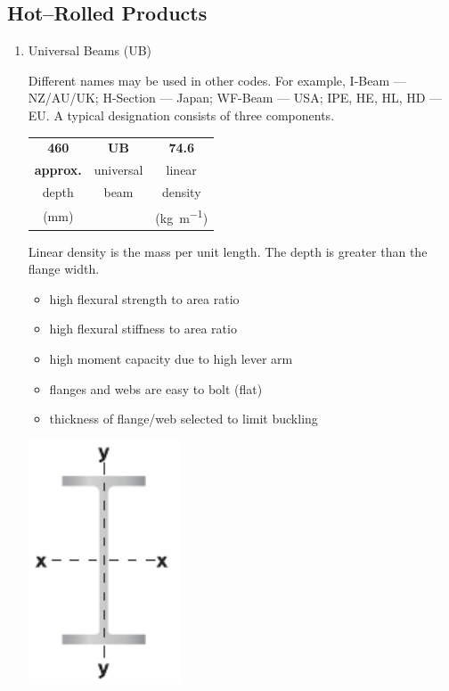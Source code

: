 \subsection{Hot--Rolled Products}
\begin{enumerate}[itemsep=1em]
\item Universal Beams (UB)\qquad\ASNZSSTEEL{~}\\[1em]
\begin{minipage}[t]{9cm}
Different names may be used in other codes. For example, I-Beam --- NZ/AU/UK; H-Section --- Japan; WF-Beam --- USA; IPE, HE, HL, HD --- EU. A typical designation consists of three components.
\begin{table}[H]\centering
\begin{tabular}{ccc}
	  \textbf{460}   & \textbf{UB} &       \textbf{74.6}        \\
	\textbf{approx.} &  universal  &           linear           \\
	     depth       &    beam     &          density           \\
	   (\si{\mm})    &             & (\si{\kilogram\per\meter})
\end{tabular}
\end{table}
Linear density is the mass per unit length. The depth is greater than the flange width.
\begin{itemize}
\item high flexural strength to area ratio
\item high flexural stiffness to area ratio
\item high moment capacity due to high lever arm
\item flanges and webs are easy to bolt (flat)
\item thickness of flange/web selected to limit buckling
\end{itemize}
\end{minipage}\hfill
\begin{minipage}[t]{5cm}
\centering\includegraphics[width=4.5cm,valign=t]{PIC/CH02/UB}

\end{minipage}
\end{enumerate}
